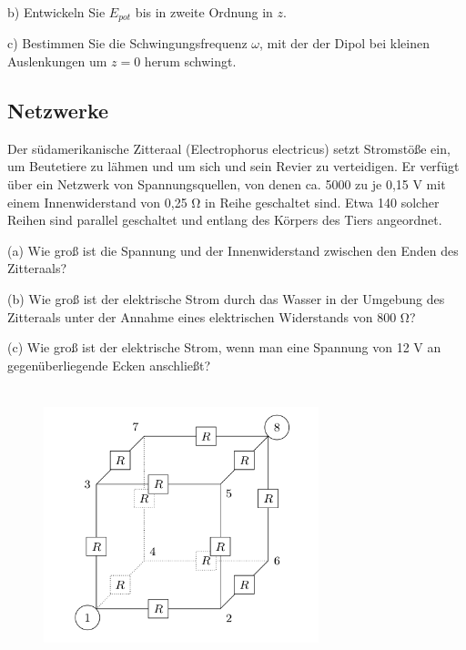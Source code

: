 \noindent b) Entwickeln Sie $E_{pot}$ bis in zweite Ordnung in $z$.

\noindent c) Bestimmen Sie die Schwingungsfrequenz $\omega$, mit der der Dipol bei kleinen Auslenkungen um $z = 0$ herum schwingt.
\newpage
\subsection{Netzwerke}

Der südamerikanische Zitteraal (Electrophorus electricus) setzt Stromstöße ein, um Beutetiere zu lähmen und um sich und sein Revier zu verteidigen. Er verfügt über ein Netzwerk von Spannungsquellen, von denen ca. 5000 zu je 0,15 V mit einem Innenwiderstand von 0,25 Ω in Reihe geschaltet sind. Etwa 140 solcher Reihen sind parallel geschaltet und entlang des Körpers des Tiers angeordnet.

\noindent (a) Wie groß ist die Spannung und der Innenwiderstand zwischen den Enden des Zitteraals?

\noindent (b) Wie groß ist der elektrische Strom durch das Wasser in der Umgebung des Zitteraals unter der Annahme eines elektrischen Widerstands von 800 Ω?

\noindent (c) Wie groß ist der elektrische Strom, wenn man eine Spannung von 12 V an gegenüberliegende Ecken anschließt?


\begin{figure}
 \centering
 \includegraphics[width= 8cm, height= 8cm]{media/screen.png}
\end{figure}
